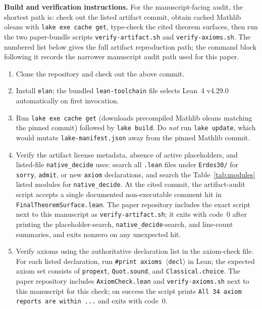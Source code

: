 \documentclass[11pt,a4paper]{article}
\begin{document}
\smallskip\noindent\textbf{Build and verification instructions.}
For the manuscript-facing audit, the shortest path is: check out the listed
artifact commit, obtain cached Mathlib oleans with \texttt{lake exe cache get},
type-check the cited theorem surfaces, then run the two paper-bundle scripts
\texttt{verify-artifact.sh} and \texttt{verify-axioms.sh}.
The numbered list below gives the full artifact reproduction path; the command
block following it records the narrower manuscript audit path used for this
paper.
\begin{enumerate}[nosep]
  \item Clone the repository and check out the above commit.
  \item Install \texttt{elan}; the bundled \texttt{lean-toolchain} file
    selects Lean~4 v4.29.0 automatically on first invocation.
  \item Run \texttt{lake exe cache get} (downloads precompiled
    Mathlib oleans matching the pinned commit) followed by
    \texttt{lake build}.  Do \emph{not} run \texttt{lake update}, which
    would mutate \texttt{lake-manifest.json} away from the pinned Mathlib
    commit.
  \item Verify the artifact license metadata, absence of active placeholders,
    and listed-file \texttt{native\_decide} uses: search all \texttt{.lean} files under
    \texttt{Erdos30/} for
    \texttt{sorry}, \texttt{admit}, or new \texttt{axiom} declarations, and
    search the Table~\ref{tab:modules} listed modules for \texttt{native\_decide}.
    At the cited commit, the artifact-audit script accepts a single documented
    non-executable comment hit in \texttt{FinalTheoremSurface.lean}.  The paper
    repository includes the exact script next to this manuscript as
    \texttt{verify-artifact.sh}; it exits with code~0 after printing
    the placeholder-search, \texttt{native\_decide}-search, and line-count
    summaries, and exits nonzero on any unexpected hit.
  \item Verify axioms using the authoritative declaration list in the
    axiom-check file.  For each listed declaration, run
    \texttt{\#print axioms \ensuremath{\langle}decl\ensuremath{\rangle}} in Lean; the
    expected axiom set consists of \texttt{propext}, \texttt{Quot.sound}, and
    \texttt{Classical.choice}.  The paper repository includes
    \texttt{AxiomCheck.lean} and
    \texttt{verify-axioms.sh} next to this manuscript for this check; on success the script
    prints \texttt{All 34 axiom reports are within ...} and exits with code~0.
\end{enumerate}
\end{document}
